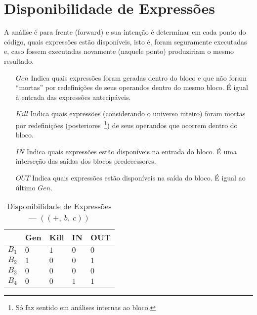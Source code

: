 \section{Disponibilidade de Express\~oes}

A an\'alise \'e para frente (\textsf{forward}) e sua inten\c{c}\~ao \'e determinar em cada ponto do c\'odigo, quais express\~oes est\~ao dispon\'iveis, isto \'e, foram seguramente executadas e, caso fossem executadas novamente (naquele ponto) produziriam o mesmo resultado.
\begin{itemize}
  \item[$Gen$] Indica quais express\~oes foram geradas dentro do bloco e que n\~ao foram ``mortas'' por redefini\c{c}\~oes de seus operandos dentro do mesmo bloco. {\color{red} \'E igual \`a entrada das express\~oes antecip\'aveis}.
  \item[$Kill$] Indica quais express\~oes (considerando o universo inteiro) foram mortas por redefini\c{c}\~oes (posteriores~\footnote{S\'o faz sentido em an\'alises internas ao bloco.}) de seus operandos que ocorrem dentro do bloco.
  \item[$IN$] Indica quais express\~oes est\~ao dispon\'iveis na entrada do bloco. \'E uma interse\c{c}\~ao das sa\'idas dos blocos predecessores.
  \item[$OUT$] Indica quais express\~oes est\~ao dispon\'iveis na sa\'ida do bloco. {\color{red} \'E igual ao \'ultimo $Gen$}.
\end{itemize}



\begin{table}[ht]
\centering
\begin{tabular}{l|l|l|l|l}
	& Gen & Kill & IN & OUT\\
\hline
$B_{1}$ &  $0$ & $1$ & $0$ & $0$\\
$B_{2}$ &  $1$ & $0$ & $0$ & $1$\\
$B_{3}$ &  $0$ & $0$ & $0$ & $0$\\
$B_{4}$ &  $0$ & $0$ & $1$ & $1$\\
\end{tabular}
\caption{Disponibilidade de Express\~oes --- $((+,\:b,\:c))$}
\end{table}


